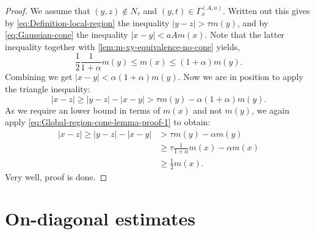 \documentclass[a4paper,oneside,10pt]{amsproc}
\theoremstyle{plain}
\theoremstyle{remark}
\theoremstyle{definition}
\renewcommand{\leq}{\leqslant}
\renewcommand{\leq}{\leqslant}
\renewcommand{\geq}{\geqslant}
\renewcommand{\leq}{\leqslant}%
\renewcommand{\geq}{\geqslant}%
\begin{document}
\begin{proof}
  We assume that $(y, z) \notin N_\tau$ and $(y, t) \in \Gamma_x^{(A,
    a)}$. Written out this gives by \eqref{eq:Definition-local-region}
  the inequality $|y - z| > \tau m(y)$, and by
  \eqref{eq:Gaussian-cone} the inequality $|x - y| < aA m(x)$. Note
  that the latter inequality together with
  \autoref{lem:m-xy-equivalence-no-cone} yields,
  \begin{equation}
    \label{eq:Global-region-cone-lemma-proof-1}
    \frac12 \frac1{1 + \alpha} m(y) \leq m(x) \leq (1 + \alpha) m(y).
  \end{equation}
  Combining we get $|x - y| < \alpha (1 + \alpha) m(y)$. Now we are in
  position to apply the triangle inequality:
  \begin{equation*}
    |x - z| \geq |y - z| - |x - y| > \tau m(y) - \alpha (1 + \alpha)
    m(y).
  \end{equation*}
  As we require an lower bound in terms of $m(x)$ and not $m(y)$, we
  again apply \eqref{eq:Global-region-cone-lemma-proof-1} to obtain:
  \begin{align*}
    |x - z| \geq |y - z| - |x - y| &> \tau m(y) - \alpha m(y)\\
    &\geq \tau \frac1{1 + \alpha} m(x) - \alpha m(x)\\
    &\geq \frac12 m(x).
  \end{align*}
  Very well, proof is done.
\end{proof}

\section{On-diagonal estimates}
\end{document}
